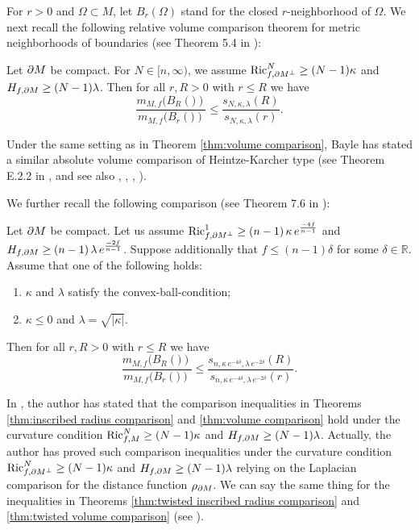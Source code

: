 For $r>0$ and $\Omega \subset M$,
let $B_{r}(\Omega)$ stand for the closed $r$-neighborhood of $\Omega$.
We next recall the following relative volume comparison theorem for metric neighborhoods of boundaries (see Theorem 5.4 in \cite{S1}):
\begin{thm}[\cite{S1}]\label{thm:volume comparison}
Let $\partial M$ be compact.
For $N\in [n,\infty)$,
we assume $\operatorname{Ric}^{N}_{f,\partial M^{\perp}}\geq (N-1)\kappa$ and $H_{f,\partial M}\geq (N-1)\lambda$.
Then for all $r,R>0$ with $r\leq R$
we have
\begin{equation*}
\frac{m_{M,f}(B_{R}(\bm))}{m_{M,f}(B_{r}(\bm))}\leq \frac{s_{N,\kappa,\lambda}(R)}{s_{N,\kappa,\lambda}(r)}.
\end{equation*}
\end{thm}
\begin{rem}
Under the same setting as in Theorem \ref{thm:volume comparison},
Bayle \cite{B} has stated a similar absolute volume comparison of Heintze-Karcher type (see Theorem E.2.2 in \cite{B}, and see also \cite{HK}, \cite{Mi3}, \cite{Mi4}, \cite{Mo}).
\end{rem}

We further recall the following comparison (see Theorem 7.6 in \cite{S2}):
\begin{thm}[\cite{S2}]\label{thm:twisted volume comparison}
Let $\partial M$ be compact.
Let us assume $\operatorname{Ric}^{1}_{f,\partial M^{\perp}}\geq (n-1) \,\kappa \,e^{\frac{-4f}{n-1}}$ and $H_{f,\partial M}\geq (n-1)\,\lambda\,e^{\frac{-2f}{n-1}}$.
Suppose additionally that
$f\leq (n-1)\delta$ for some $\delta \in \mathbb{R}$.
Assume that
one of the following holds:
\begin{enumerate}
\item $\kappa$ and $\lambda$ satisfy the convex-ball-condition;
\item $\kappa \leq 0$ and $\lambda=\sqrt{\vert \kappa \vert}$.
\end{enumerate}
Then for all $r,R>0$ with $r\leq R$
we have
\begin{equation*}
\frac{m_{M,f}(B_{R}(\bm))}{m_{M,f}(B_{r}(\bm))}\leq \frac{s_{n,\kappa\,e^{-4\delta},\lambda\,e^{-2\delta}}(R)}{s_{n,\kappa\,e^{-4\delta},\lambda\,e^{-2\delta}}(r)}.
\end{equation*}
\end{thm}

\begin{rem}\label{rem:remark on the curvature assumption}
In \cite{S1},
the author has stated that
the comparison inequalities in Theorems \ref{thm:inscribed radius comparison} and \ref{thm:volume comparison} hold
under the curvature condition $\operatorname{Ric}^{N}_{f,M}\geq (N-1)\kappa$ and $H_{f,\partial M}\geq (N-1)\lambda$.
Actually,
the author \cite{S1} has proved such comparison inequalities under the curvature condition $\operatorname{Ric}^{N}_{f,\partial M^{\perp}}\geq (N-1)\kappa$ and $H_{f,\partial M}\geq (N-1)\lambda$ relying on the Laplacian comparison for the distance function $\rho_{\partial M}$.
We can say the same thing for the inequalities in Theorems \ref{thm:twisted inscribed radius comparison} and \ref{thm:twisted volume comparison} (see \cite{S2}).
\end{rem}
